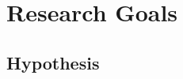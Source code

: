 \section{Research Goals}
\begin{comment}
- Investigate related system

- Requirement analysis

- Conceptual design of an interactive feedback system for slacklining
-- Provide supportive feedback

- User interface design

- Integration

- Investigation of the system
\end{comment}
\subsection{Hypothesis}
\begin{comment}

- Show if an interactive real time feedback system is usable for this kind of sport

- If the learning progress is comparable with other training methods like human trainer

- If such a system motivates user for slackline exercises
\end{comment}